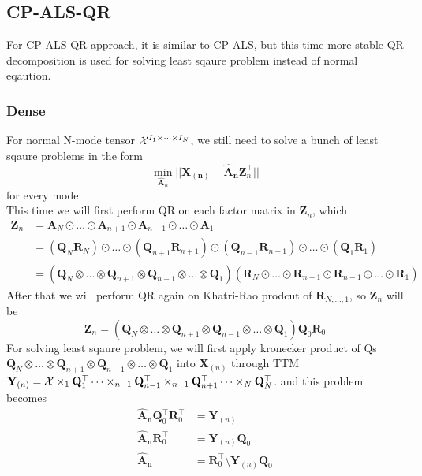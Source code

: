 \documentclass{article}
\newcommand{\mat}[1]{\mathbf{#1}}
\newcommand{\T}[2][]{#1{\mathbf{\cal{#2}}}} 						%
\begin{document}
\subsection*{CP-ALS-QR}
For CP-ALS-QR approach, it is similar to CP-ALS, but this time more stable QR decomposition is used for solving least sqaure
problem instead of normal eqaution.
\subsubsection*{Dense}
For normal N-mode tensor $\T{X}^{I_1 \times \dots \times I_N}$, we still need to solve a bunch of least sqaure problems in the form
$$\min_{\mat{\hat{A}}_n}||\mat{X_{(n)}} - {\mat{\hat{A}_n}}\mat{Z}^\top_n ||$$
for every mode.\\
This time we will first perform QR on each factor matrix in $\mat{Z}_n$, which 
\begin{align}
  \mat{Z}_n &= \mat{A}_N \odot \dots \odot \mat{A}_{n+1} \odot \mat{A}_{n-1} \odot \dots \odot \mat{A}_1 \nonumber \\
  &= (\mat{Q}_N\mat{R}_N) \odot \dots \odot (\mat{Q}_{n+1}\mat{R}_{n+1}) \odot (\mat{Q}_{n-1}\mat{R}_{n-1}) \odot \dots \odot (\mat{Q}_1\mat{R}_1) \nonumber \\
  &= (\mat{Q}_N \otimes \dots \otimes \mat{Q}_{n+1} \otimes \mat{Q}_{n-1} \otimes \dots \otimes \mat{Q}_1)(\mat{R}_N \odot \dots \odot \mat{R}_{n+1} \odot \mat{R}_{n-1} \odot \dots \odot \mat{R}_1)\nonumber  
\end{align}
After that we will perform QR again on Khatri-Rao prodcut of $\mat{R}_{N,\dots,1}$, so $\mat{Z}_n$ will be
$$\mat{Z}_n = (\mat{Q}_N \otimes \dots \otimes \mat{Q}_{n+1} \otimes \mat{Q}_{n-1} \otimes \dots \otimes \mat{Q}_1)\mat{Q}_0\mat{R}_0$$
For solving least sqaure problem, we will first apply kronecker product of Qs 
$\mat{Q}_N \otimes \dots \otimes \mat{Q}_{n+1} \otimes \mat{Q}_{n-1} \otimes \dots \otimes \mat{Q}_1$ into $\mat{X}_{(n)}$ through TTM 
$\mat{Y}_{(n)} =  \T{X} \times_1 \mat{Q}_1^\top \dots \times_{n-1} \mat{Q}_{n-1}^\top \times_{n+1} \mat{Q}_{n+1}^\top \dots \times_N \mat{Q}_N^\top$.
and this problem becomes
\begin{align}
  \mat{\hat{A}_n}\mat{Q}_0^\top \mat{R}_0^\top &= \mat{Y}_{(n)} \nonumber \\
  \mat{\hat{A}_n}\mat{R}_0^\top &= \mat{Y}_{(n)} \mat{Q}_0 \nonumber \\
  \mat{\hat{A}_n} &= \mat{R}_0^\top \text{\textbackslash} \mat{Y}_{(n)} \mat{Q}_0 \nonumber
\end{align}
\end{document}
